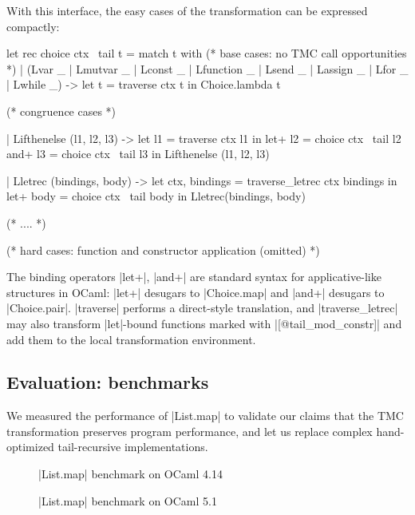 With this interface, the easy cases of the transformation can be expressed compactly:
\begin{Ocaml}
  let rec choice ctx ~tail t =
    match t with
    (* base cases: no TMC call opportunities *)
    | (Lvar _ | Lmutvar _ | Lconst _ | Lfunction _ | Lsend _
      | Lassign _ | Lfor _ | Lwhile _) ->
        let t = traverse ctx t in
        Choice.lambda t

    (* congruence cases *)

    | Lifthenelse (l1, l2, l3) ->
        let l1 = traverse ctx l1 in
        let+ l2 = choice ctx ~tail l2
        and+ l3 = choice ctx ~tail l3
        in Lifthenelse (l1, l2, l3)

    | Lletrec (bindings, body) ->
        let ctx, bindings = traverse_letrec ctx bindings in
        let+ body = choice ctx ~tail body in
        Lletrec(bindings, body)

    (* .... *)

    (* hard cases: function and constructor application
       (omitted)  *)
\end{Ocaml}
The binding operators \ocaml|let+|, \ocaml|and+| are standard syntax for applicative-like structures in OCaml: \ocaml|let+| desugars to \ocaml|Choice.map| and \ocaml|and+| desugars to |Choice.pair|. \ocaml|traverse| performs a direct-style translation, and \ocaml|traverse_letrec| may also transform \ocaml|let|-bound functions marked with \ocaml|[@tail_mod_constr]| and add them to the local transformation environment.

\subsection{Evaluation: benchmarks}

We measured the performance of \ocaml|List.map| to validate our claims that the TMC transformation preserves program performance, and let us replace complex hand-optimized tail-recursive implementations.

\begin{figure}[tp]
\def\svgscale{0.8}
\graphicspath{{plots/}}

\caption{\ocaml|List.map| benchmark on OCaml 4.14}
\label{fig:bench4}
\end{figure}

\begin{figure}[tp]
\def\svgscale{0.8}
\graphicspath{{plots/}}

\caption{\ocaml|List.map| benchmark on OCaml 5.1}
\label{fig:bench5}
\end{figure}

